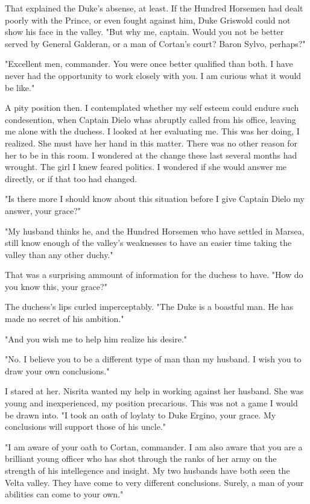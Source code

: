 \documentclass{article}
\begin{document}
That explained the Duke's absense, at least. If the Hundred Horsemen had dealt poorly with the Prince, or even fought against him, Duke Griswold could not show his face in the valley. "But why me, captain. Would you not be better served by General Galderan, or a man of Cortan's court? Baron Sylvo, perhaps?"

"Excellent men, commander. You were once better qualified than both. I have never had the opportunity to work closely with you. I am curious what it would be like."

A pity position then. I contemplated whether my self esteem could endure such condesention, when Captain Dielo whas abruptly called from his office, leaving me alone with the duchess. I looked at her evaluating me. This was her doing, I realized. She must have her hand in this matter. There was no other reason for her to be in this room. I wondered at the change these last several months had wrought. The girl I knew feared politics. I wondered if she would answer me directly, or if that too had changed.

"Is there more I should know about this situation before I give Captain Dielo my answer, your grace?"

"My husband thinks he, and the Hundred Horsemen who have settled in Marsea, still know enough of the valley's weaknesses to have an easier time taking the valley than any other duchy."

That was a surprising ammount of information for the duchess to have. "How do you know this, your grace?"

The duchess's lips curled imperceptably. "The Duke is  a boastful man. He has made no secret of his ambition."

"And you wish me to help him realize his desire."

"No. I believe you to be a different type of man than my husband. I wish you to draw your own conclusions."

I stared at her. Nisrita wanted my help in working against her husband. She was young and inexperienced, my position precarious. This was not a game I would be drawn into. "I took an oath of loylaty to Duke Ergino, your grace. My conclusions will support those of his uncle."

"I am aware of your oath to Cortan, commander. I am also aware that you are a brilliant young officer who has shot through the ranks of her army on the strength of his intellegence and insight. My two husbands have both seen the Velta valley. They have come to very different conclusions. Surely, a man of your abilities can come to your own."
\end{document}
